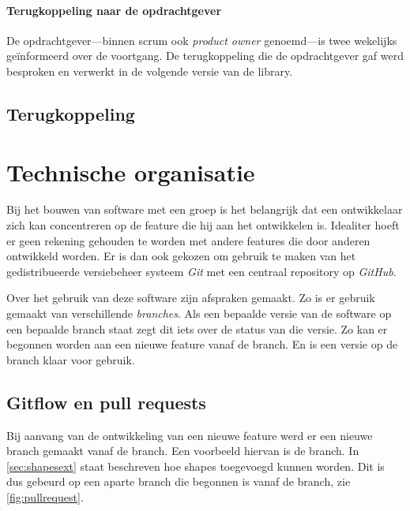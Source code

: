 \paragraph{Terugkoppeling naar de opdrachtgever} De opdrachtgever—binnen scrum ook \emph{product owner} genoemd—is twee wekelijks ge\"informeerd over de voortgang. De terugkoppeling die de opdrachtgever gaf werd besproken en verwerkt in de volgende versie van de library.

\subsection{Terugkoppeling}

\section{Technische organisatie}  \label{sec:technische_organisatie}
Bij het bouwen van software met een groep is het belangrijk dat een ontwikkelaar zich kan concentreren op de feature die hij aan het ontwikkelen is. Idealiter hoeft er geen rekening gehouden te worden met andere features die door anderen ontwikkeld worden. Er is dan ook gekozen om gebruik te maken van het gedistribueerde versiebeheer systeem \emph{Git} met een centraal repository op \emph{GitHub}.

Over het gebruik van deze software zijn afspraken gemaakt. Zo is er gebruik gemaakt van verschillende \emph{branches}. Als een bepaalde versie van de software op een bepaalde branch staat zegt dit iets over de status van die versie. Zo kan er begonnen worden aan een nieuwe feature vanaf de  branch. En is een versie op de  branch klaar voor gebruik.

\subsection{Gitflow en pull requests}

Bij aanvang van de ontwikkeling van een nieuwe feature werd er een nieuwe branch gemaakt vanaf de  branch. Een voorbeeld hiervan is de  branch. In \autoref{sec:shapesext} staat beschreven hoe  shapes toegevoegd kunnen worden. Dit is dus gebeurd op een aparte branch die begonnen is vanaf de  branch, zie \autoref{fig:pullrequest}. 

